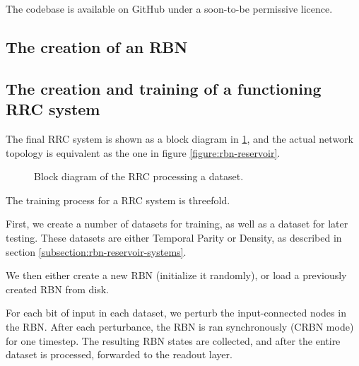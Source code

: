 The codebase is available on GitHub \cite{forprosjekt-code-github} under a soon-to-be permissive licence.

\subsection{The creation of an RBN}


\subsection{The creation and training of a functioning RRC system}

The final RRC system is shown as a block diagram in \ref{figure:rrc-block},
and the actual network topology is equivalent as the one in figure \ref{figure:rbn-reservoir}.

\begin{figure}
  \centering
  \caption{Block diagram of the RRC processing a dataset.}
  \label{figure:rrc-block}
\end{figure}

The training process for a RRC system is threefold.

First, we create a number of datasets for training,
as well as a dataset for later testing.
These datasets are either Temporal Parity or Density,
as described in section \ref{subsection:rbn-reservoir-systems}.

We then either create a new RBN (initialize it randomly),
or load a previously created RBN from disk.

For each bit of input in each dataset,
we perturb the input-connected nodes in the RBN.
After each perturbance, the RBN is ran synchronously (CRBN mode) for one timestep.
The resulting RBN states are collected,
and after the entire dataset is processed,
forwarded to the readout layer.

